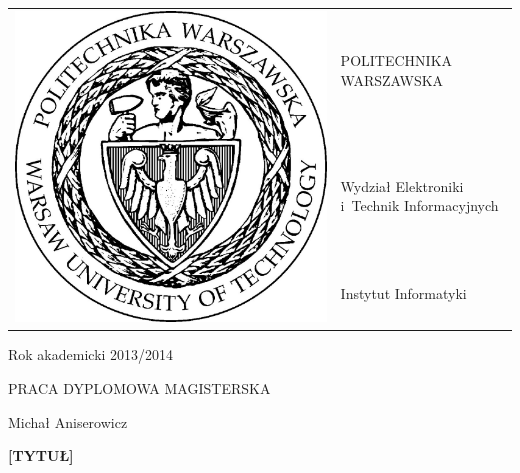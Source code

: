 \begin{titlepage}

 \begin{tabular}{ll}
  \multirow{3}{*}{\includegraphics[scale=0.3]{figures/pw.jpg}} & POLITECHNIKA WARSZAWSKA                      \\
                                                               & Wydział Elektroniki i~Technik Informacyjnych \\
                                                               & Instytut Informatyki
 \end{tabular}
 
 \begin{flushright}
  Rok akademicki 2013/2014
 \end{flushright}

 \vspace{2cm}
 
 \begin{center}
  \LARGE PRACA DYPLOMOWA MAGISTERSKA
  
  \vspace{2cm}
  
  \large Michał Aniserowicz
  
  \vspace{2cm}
  
  \textbf{[TYTUŁ]}
 \end{center}
 

\end{titlepage}
